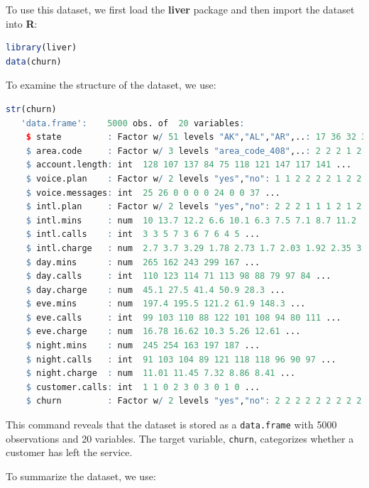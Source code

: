 \documentclass[
]{book}
\newcommand{\passthrough}[1]{#1}
\theoremstyle{definition}
\theoremstyle{definition}
\theoremstyle{definition}
\theoremstyle{definition}
\theoremstyle{remark}
\begin{document}
To use this dataset, we first load the \textbf{liver} package and then import the dataset into \textbf{R}:

\begin{lstlisting}[language=R]
library(liver)
data(churn)  
\end{lstlisting}

To examine the structure of the dataset, we use:

\begin{lstlisting}[language=R]
str(churn)  
   'data.frame':    5000 obs. of  20 variables:
    $ state         : Factor w/ 51 levels "AK","AL","AR",..: 17 36 32 36 37 2 20 25 19 50 ...
    $ area.code     : Factor w/ 3 levels "area_code_408",..: 2 2 2 1 2 3 3 2 1 2 ...
    $ account.length: int  128 107 137 84 75 118 121 147 117 141 ...
    $ voice.plan    : Factor w/ 2 levels "yes","no": 1 1 2 2 2 2 1 2 2 1 ...
    $ voice.messages: int  25 26 0 0 0 0 24 0 0 37 ...
    $ intl.plan     : Factor w/ 2 levels "yes","no": 2 2 2 1 1 1 2 1 2 1 ...
    $ intl.mins     : num  10 13.7 12.2 6.6 10.1 6.3 7.5 7.1 8.7 11.2 ...
    $ intl.calls    : int  3 3 5 7 3 6 7 6 4 5 ...
    $ intl.charge   : num  2.7 3.7 3.29 1.78 2.73 1.7 2.03 1.92 2.35 3.02 ...
    $ day.mins      : num  265 162 243 299 167 ...
    $ day.calls     : int  110 123 114 71 113 98 88 79 97 84 ...
    $ day.charge    : num  45.1 27.5 41.4 50.9 28.3 ...
    $ eve.mins      : num  197.4 195.5 121.2 61.9 148.3 ...
    $ eve.calls     : int  99 103 110 88 122 101 108 94 80 111 ...
    $ eve.charge    : num  16.78 16.62 10.3 5.26 12.61 ...
    $ night.mins    : num  245 254 163 197 187 ...
    $ night.calls   : int  91 103 104 89 121 118 118 96 90 97 ...
    $ night.charge  : num  11.01 11.45 7.32 8.86 8.41 ...
    $ customer.calls: int  1 1 0 2 3 0 3 0 1 0 ...
    $ churn         : Factor w/ 2 levels "yes","no": 2 2 2 2 2 2 2 2 2 2 ...
\end{lstlisting}

This command reveals that the dataset is stored as a \passthrough{\lstinline!data.frame!} with 5000 observations and 20 variables. The target variable, \passthrough{\lstinline!churn!}, categorizes whether a customer has left the service.

To summarize the dataset, we use:
\end{document}
